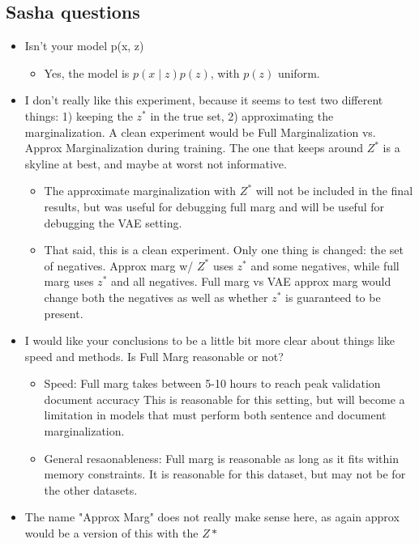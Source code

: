\documentclass[11pt]{article}
\begin{document}
\subsection{Sasha questions}
\begin{itemize}
\item Isn't your model p(x, z)
    \begin{itemize}
    \item Yes, the model is $p(x\mid z)p(z)$, with $p(z)$ uniform.
    \end{itemize}
\item I don't really like this experiment, because it seems to test two different things:
    1) keeping the $z^*$ in the true set, 2) approximating the marginalization.
    A clean experiment would be Full Marginalization vs. Approx Marginalization during training.
    The one that keeps around $Z^*$ is a skyline at best, and maybe at worst not informative.
    \begin{itemize}
    \item The approximate marginalization with $Z^*$ will not be included in the final results,
        but was useful for debugging full marg and will be useful for debugging the VAE setting.
    \item That said, this is a clean experiment. Only one thing is changed: the set of negatives.
        Approx marg w/ $Z^*$ uses $z^*$ and some negatives,
        while full marg uses $z^*$ and all negatives.
        Full marg vs VAE approx marg would change both the negatives as well as whether $z^*$
            is guaranteed to be present.
    \end{itemize}
\item I would like your conclusions to be a little bit more clear about things like
    speed and methods. Is Full Marg reasonable or not?
    \begin{itemize}
    \item Speed: Full marg takes between 5-10 hours to reach peak validation document accuracy
        This is reasonable for this setting, but will become a limitation in models
        that must perform both sentence and document marginalization.
    \item General resaonableness: Full marg is reasonable as long as it fits within memory constraints.
        It is reasonable for this dataset, but may not be for the other datasets.
    \end{itemize}
\item The name "Approx Marg" does not really make sense here, as again approx would be a version of this with the $Z*$

\end{itemize}
\end{document}
